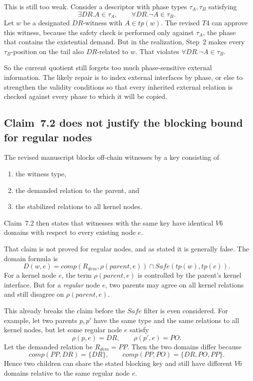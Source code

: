 \documentclass[11pt]{article}
\begin{document}
This is still too weak. Consider a descriptor with phase types $\tau_A,\tau_B$ satisfying
\[
\exists DR.A \in \tau_A, \qquad \forall DR.\neg A \in \tau_B.
\]
Let $w$ be a designated $DR$-witness with $A \in tp(w)$. The revised $T4$ can approve this witness, because the safety check is performed only against $\tau_A$, the phase that contains the existential demand. But in the realization, Step~2 makes every $\tau_B$-position on the tail also $DR$-related to $w$. That violates $\forall DR.\neg A \in \tau_B$.

So the current quotient still forgets too much phase-sensitive external information. The likely repair is to index external interfaces by phase, or else to strengthen the validity conditions so that every inherited external relation is checked against every phase to which it will be copied.

\subsection{Claim~7.2 does not justify the blocking bound for regular nodes}

The revised manuscript blocks off-chain witnesses by a key consisting of
\begin{enumerate}
  \item the witness type,
  \item the demanded relation to the parent, and
  \item the stabilized relations to all kernel nodes.
\end{enumerate}
Claim~7.2 then states that witnesses with the same key have identical $V6$ domains with respect to every existing node $e$.

That claim is not proved for regular nodes, and as stated it is generally false. The domain formula is
\[
D(w,e)=comp(R_{dem},\rho(parent,e)) \cap Safe(tp(w),tp(e)).
\]
For a kernel node $e$, the term $\rho(parent,e)$ is controlled by the parent's kernel interface. But for a \emph{regular} node $e$, two parents may agree on all kernel relations and still disagree on $\rho(parent,e)$.

This already breaks the claim before the $Safe$ filter is even considered. For example, let two parents $p,p'$ have the same type and the same relations to all kernel nodes, but let some regular node $e$ satisfy
\[
\rho(p,e)=DR, \qquad \rho(p',e)=PO.
\]
Let the demanded relation be $R_{dem}=PP$. Then the two domains differ because
\[
comp(PP,DR)=\{DR\},
\qquad
comp(PP,PO)=\{DR,PO,PP\}.
\]
Hence two children can share the stated blocking key and still have different $V6$ domains relative to the same regular node $e$.
\end{document}
